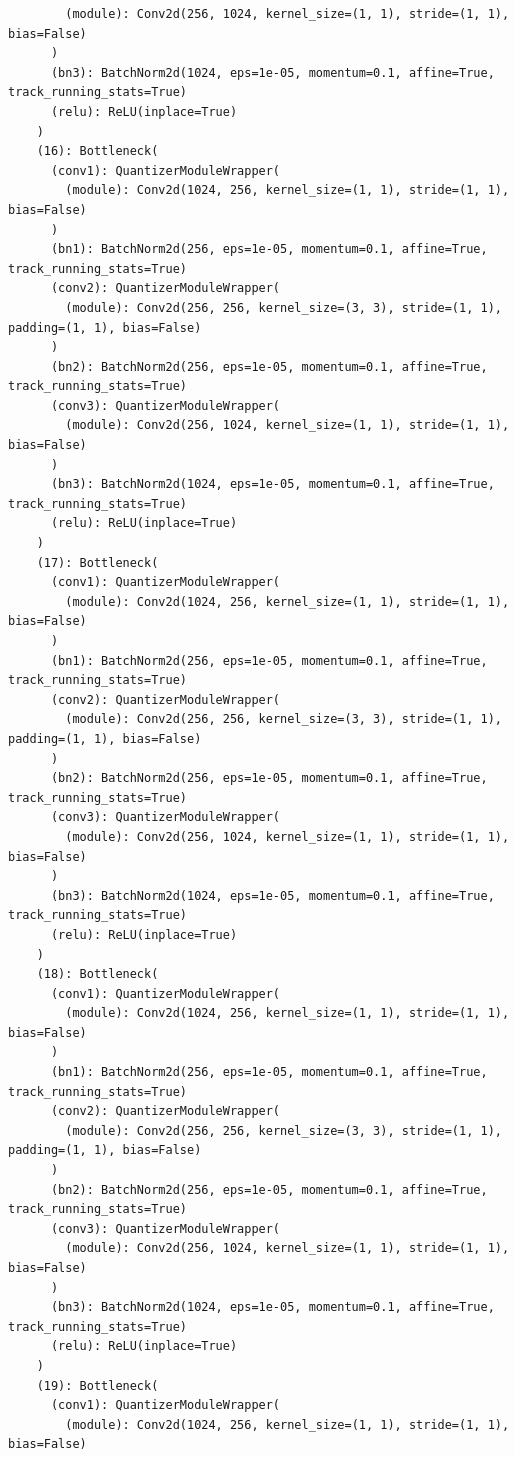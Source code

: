 \documentclass{article}
\begin{document}
\begin{verbatim}
        (module): Conv2d(256, 1024, kernel_size=(1, 1), stride=(1, 1), bias=False)
      )
      (bn3): BatchNorm2d(1024, eps=1e-05, momentum=0.1, affine=True, track_running_stats=True)
      (relu): ReLU(inplace=True)
    )
    (16): Bottleneck(
      (conv1): QuantizerModuleWrapper(
        (module): Conv2d(1024, 256, kernel_size=(1, 1), stride=(1, 1), bias=False)
      )
      (bn1): BatchNorm2d(256, eps=1e-05, momentum=0.1, affine=True, track_running_stats=True)
      (conv2): QuantizerModuleWrapper(
        (module): Conv2d(256, 256, kernel_size=(3, 3), stride=(1, 1), padding=(1, 1), bias=False)
      )
      (bn2): BatchNorm2d(256, eps=1e-05, momentum=0.1, affine=True, track_running_stats=True)
      (conv3): QuantizerModuleWrapper(
        (module): Conv2d(256, 1024, kernel_size=(1, 1), stride=(1, 1), bias=False)
      )
      (bn3): BatchNorm2d(1024, eps=1e-05, momentum=0.1, affine=True, track_running_stats=True)
      (relu): ReLU(inplace=True)
    )
    (17): Bottleneck(
      (conv1): QuantizerModuleWrapper(
        (module): Conv2d(1024, 256, kernel_size=(1, 1), stride=(1, 1), bias=False)
      )
      (bn1): BatchNorm2d(256, eps=1e-05, momentum=0.1, affine=True, track_running_stats=True)
      (conv2): QuantizerModuleWrapper(
        (module): Conv2d(256, 256, kernel_size=(3, 3), stride=(1, 1), padding=(1, 1), bias=False)
      )
      (bn2): BatchNorm2d(256, eps=1e-05, momentum=0.1, affine=True, track_running_stats=True)
      (conv3): QuantizerModuleWrapper(
        (module): Conv2d(256, 1024, kernel_size=(1, 1), stride=(1, 1), bias=False)
      )
      (bn3): BatchNorm2d(1024, eps=1e-05, momentum=0.1, affine=True, track_running_stats=True)
      (relu): ReLU(inplace=True)
    )
    (18): Bottleneck(
      (conv1): QuantizerModuleWrapper(
        (module): Conv2d(1024, 256, kernel_size=(1, 1), stride=(1, 1), bias=False)
      )
      (bn1): BatchNorm2d(256, eps=1e-05, momentum=0.1, affine=True, track_running_stats=True)
      (conv2): QuantizerModuleWrapper(
        (module): Conv2d(256, 256, kernel_size=(3, 3), stride=(1, 1), padding=(1, 1), bias=False)
      )
      (bn2): BatchNorm2d(256, eps=1e-05, momentum=0.1, affine=True, track_running_stats=True)
      (conv3): QuantizerModuleWrapper(
        (module): Conv2d(256, 1024, kernel_size=(1, 1), stride=(1, 1), bias=False)
      )
      (bn3): BatchNorm2d(1024, eps=1e-05, momentum=0.1, affine=True, track_running_stats=True)
      (relu): ReLU(inplace=True)
    )
    (19): Bottleneck(
      (conv1): QuantizerModuleWrapper(
        (module): Conv2d(1024, 256, kernel_size=(1, 1), stride=(1, 1), bias=False)

\end{verbatim}
\end{document}
